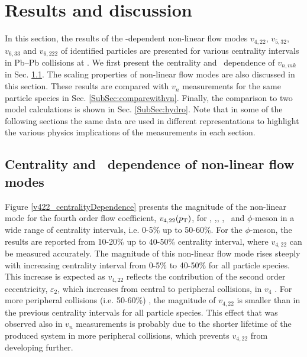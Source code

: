 \newpage

\section{Results and discussion}
\label{Sec:Results}

In this section, the results of the \pT-dependent non-linear flow modes $v_{4,22}$, $v_{5,32}$, $v_{6,33}$ and $v_{6,222}$ of identified particles are presented for various centrality intervals in Pb--Pb collisions at \sNN. We first present the centrality and \pT~dependence of $v_{n,mk}$ in Sec. \ref{SubSec:pTdependence}. The scaling properties of non-linear flow modes are also discussed in this section. These results are compared with $v_{n}$ measurements for the same particle species in Sec. \ref{SubSec:comparewithvn}. Finally, the comparison to two model calculations is shown in Sec. \ref{SubSec:hydro}. Note that in some of the following sections the same data are used in different representations to highlight the various physics implications of the measurements in each section.


\subsection{Centrality and \pT~dependence of non-linear flow modes}
\label{SubSec:pTdependence}

Figure \ref{v422_centralityDependence} presents the magnitude of the non-linear mode for the fourth order flow coefficient, $v_{4,22}(p_{\rm{T}})$, for \pion, \kaon,\Ks, \proton, \lambdas~and $\phi$-meson in a wide range of centrality intervals, i.e. 0-5\% up to 50-60\%. For the $\phi$-meson, the results are reported from 10-20\% up to 40-50\% centrality interval, where $v_{4,22}$ can be measured accurately. The magnitude of this non-linear flow mode rises steeply with increasing centrality interval from 0-5\% to 40-50\% for all particle species. This increase is expected as $v_{4,22}$ reflects the contribution of the second order eccentricity, $\varepsilon_{2}$, which increases from central to peripheral collisions, in $v_{4}$ \cite{Alver:2010gr, Acharya:2017zfg}. For more peripheral collisions (i.e. 50-60\%) , the magnitude of $v_{4,22}$ is smaller than in the previous centrality intervals for all particle species. This effect that was observed also in $v_n$ measurements is probably due to the shorter lifetime of the produced system in more peripheral collisions, which prevents $v_{4,22}$ from developing further. 


